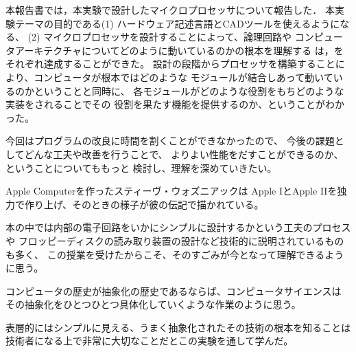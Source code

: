 \documentclass{jarticle}[11pt]
\begin{document}
\noindent

本報告書では，本実験で設計したマイクロプロセッサについて報告した．
本実験テーマの目的である(1) ハードウェア記述言語とCADツールを使えるようになる、
(2) マイクロプロセッサを設計することによって、論理回路や
コンピュータアーキテクチャについてどのように動いているのかの根本を理解する
は，をそれぞれ達成することができた。
設計の段階からプロセッサを構築することにより、コンピュータが根本ではどのような
モジュールが結合しあって動いているのかということと同時に、
各モジュールがどのような役割をもちどのような実装をされることでその
役割を果たす機能を提供するのか、ということがわかった。

\vspace{0.2in}

今回はプログラムの改良に時間を割くことができなかったので、
今後の課題としてどんな工夫や改善を行うことで、
よりよい性能をだすことができるのか、ということについてももっと
検討し、理解を深めていきたい。

\vspace{0.2in}

Apple Computerを作ったスティーヴ・ウォズニアックは
Apple IとApple IIを独力で作り上げ、そのときの様子が彼の伝記で描かれている。

本の中では内部の電子回路をいかにシンプルに設計するかという工夫のプロセスや
フロッピーディスクの読み取り装置の設計など技術的に説明されているものも多く、
この授業を受けたからこそ、そのすごみが今となって理解できるように思う。

\vspace{0.2in}

コンピュータの歴史が抽象化の歴史であるならば、コンピュータサイエンスは
その抽象化をひとつひとつ具体化していくような作業のように思う。

表層的にはシンプルに見える、うまく抽象化されたその技術の根本を知ることは
技術者になる上で非常に大切なことだとこの実験を通して学んだ。



\end{document}
